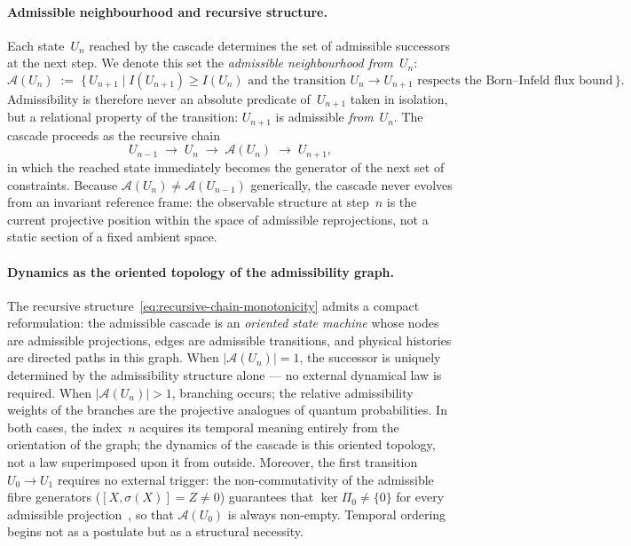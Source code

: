   \paragraph{Admissible neighbourhood and recursive structure.}
    Each state~$U_n$ reached by the cascade determines the set of admissible
    successors at the next step.
    We denote this set the \emph{admissible neighbourhood from~$U_n$}:
    \begin{equation}
      \mathcal{A}(U_n) \;:=\;
      \bigl\{\, U_{n+1} \mid
      I(U_{n+1}) \ge I(U_n)
      \text{ and the transition } U_n \to U_{n+1}
      \text{ respects the Born--Infeld flux bound}
      \,\bigr\}.
    \end{equation}
    Admissibility is therefore never an absolute predicate of~$U_{n+1}$ taken
    in isolation, but a relational property of the transition: $U_{n+1}$ is
    admissible \emph{from}~$U_n$.
    The cascade proceeds as the recursive chain
    \begin{equation}
      \label{eq:recursive-chain-monotonicity}
      U_{n-1}
      \;\longrightarrow\; U_n
      \;\longrightarrow\; \mathcal{A}(U_n)
      \;\longrightarrow\; U_{n+1},
    \end{equation}
    in which the reached state immediately becomes the generator of the next
    set of constraints.
    Because $\mathcal{A}(U_n) \neq \mathcal{A}(U_{n-1})$ generically, the
    cascade never evolves from an invariant reference frame: the observable
    structure at step~$n$ is the current projective position within the space
    of admissible reprojections, not a static section of a fixed ambient space.

  \paragraph{Dynamics as the oriented topology of the admissibility graph.}
    The recursive structure~\eqref{eq:recursive-chain-monotonicity} admits a
    compact reformulation: the admissible cascade is an \emph{oriented state
machine} whose nodes are admissible projections, edges are admissible
    transitions, and physical histories are directed paths in this graph.
    When $|\mathcal{A}(U_n)| = 1$, the successor is uniquely determined by the
    admissibility structure alone — no external dynamical law is required.
    When $|\mathcal{A}(U_n)| > 1$, branching occurs; the relative admissibility
    weights of the branches are the projective analogues of quantum
    probabilities.
    In both cases, the index~$n$ acquires its temporal meaning entirely from the
    orientation of the graph; the dynamics of the cascade is this oriented
    topology, not a law superimposed upon it from outside.
    Moreover, the first transition $U_0 \to U_1$ requires no external trigger:
    the non-commutativity of the admissible fibre generators
    ($[X,\sigma(X)] = Z \neq 0$) guarantees that $\ker\Pi_0 \neq \{0\}$ for
    every admissible projection~\cite{Beau2026m}, so that $\mathcal{A}(U_0)$
    is always non-empty.
    Temporal ordering begins not as a postulate but as a structural necessity.

